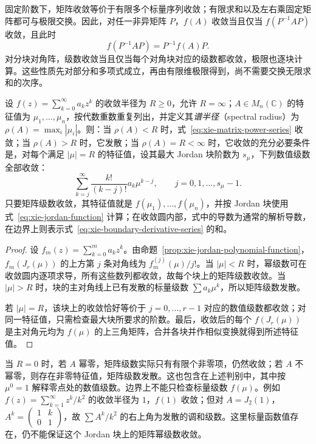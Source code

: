 固定阶数下，矩阵收敛等价于有限多个标量序列收敛；有限求和以及左右乘固定矩阵都可与极限交换。因此，对任一非异矩阵 $P$，$f(A)$ 收敛当且仅当 $f(P^{-1}AP)$ 收敛，且此时
\[
    f(P^{-1}AP)=P^{-1}f(A)P.
\]
对分块对角阵，级数收敛当且仅当每个对角块对应的级数都收敛，极限也逐块计算。这些性质先对部分和多项式成立，再由有限维极限得到，尚不需要交换无限求和的次序。

\begin{theorem}
\label{thm:xie-matrix-series-convergence}
设 $f(z)=\sum_{k=0}^{\infty}a_kz^k$ 的收敛半径为 $R\ge0$，允许 $R=\infty$；$A\in M_n(\mathbb C)$ 的特征值为 $\mu_1,\ldots,\mu_n$，按代数重数重复列出，并定义其\emph{谱半径}（spectral radius）为 $\rho(A)=\max_i|\mu_i|$。则：当 $\rho(A)<R$ 时，式~\eqref{eq:xie-matrix-power-series} 收敛；当 $\rho(A)>R$ 时，它发散；当 $\rho(A)=R<\infty$ 时，它收敛的充分必要条件是，对每个满足 $|\mu|=R$ 的特征值，设其最大 Jordan 块阶数为 $s_\mu$，下列数值级数全部收敛：
\begin{equation}
\label{eq:xie-boundary-derivative-series}
    \sum_{k=j}^{\infty}\frac{k!}{(k-j)!}a_k\mu^{k-j},
    \qquad j=0,1,\ldots,s_\mu-1.
\end{equation}
只要矩阵级数收敛，其特征值就是 $f(\mu_1),\ldots,f(\mu_n)$，并按 Jordan 块使用式~\eqref{eq:xie-jordan-function} 计算；在收敛圆内部，式中的导数为通常的解析导数，在边界上则表示式~\eqref{eq:xie-boundary-derivative-series} 的和。
\end{theorem}
\begin{proof}
设 $f_m(z)=\sum_{k=0}^m a_kz^k$。由命题~\ref{prop:xie-jordan-polynomial-function}，$f_m(J_r(\mu))$ 的上方第 $j$ 条对角线为 $f_m^{(j)}(\mu)/j!$。当 $|\mu|<R$ 时，幂级数可在收敛圆内逐项求导，所有这些数列都收敛，故每个块上的矩阵级数收敛。当 $|\mu|>R$ 时，块的主对角线上已有发散的标量级数 $\sum a_k\mu^k$，所以矩阵级数发散。

若 $|\mu|=R$，该块上的收敛恰好等价于 $j=0,\ldots,r-1$ 对应的数值级数都收敛；对同一特征值，只需检查最大块所要求的阶数。最后，收敛后的每个 $f(J_r(\mu))$ 是主对角元均为 $f(\mu)$ 的上三角矩阵，合并各块并作相似变换就得到所述特征值。
\end{proof}

当 $R=0$ 时，若 $A$ 幂零，矩阵级数实际只有有限个非零项，仍然收敛；若 $A$ 不幂零，则存在非零特征值，矩阵级数发散。这也包含在上述判别中，其中按 $\mu^0=1$ 解释零点处的数值级数。边界上不能只检查标量级数 $f(\mu)$。例如 $f(z)=\sum_{k=1}^{\infty}z^k/k^2$ 的收敛半径为 $1$，$f(1)$ 收敛；但对 $A=J_2(1)$，$A^k=\begin{pmatrix}1&k\\0&1\end{pmatrix}$，故 $\sum A^k/k^2$ 的右上角为发散的调和级数。这里标量函数值存在，仍不能保证这个 Jordan 块上的矩阵幂级数收敛。

